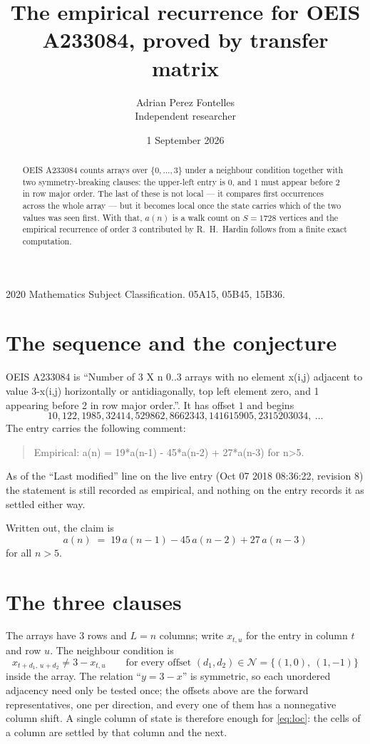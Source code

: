 \documentclass[11pt,a4paper]{article}
\title{The empirical recurrence for OEIS A233084, proved by transfer matrix}
\author{Adrian Perez Fontelles\\ \small Independent researcher}
\date{1 September 2026}
\theoremstyle{plain}
\theoremstyle{definition}
\begin{document}
\maketitle

\begin{abstract}
OEIS A233084 counts arrays over $\{0,\dots,3\}$ under a neighbour condition together with
two symmetry-breaking clauses: the upper-left entry is $0$, and $1$ must appear before
$2$ in row major order. The last of these is not local --- it compares first occurrences
across the whole array --- but it becomes local once the state carries which of the two values
was seen first. With that, $a(n)$ is a walk count on $S=1728$ vertices and the empirical
recurrence of order $3$ contributed by R.~H.~Hardin follows from a finite exact
computation.
\end{abstract}

\noindent\small 2020 Mathematics Subject Classification. 05A15, 05B45, 15B36.\normalsize

\section{The sequence and the conjecture}

OEIS A233084 is ``Number of 3 X n 0..3 arrays with no element x(i,j) adjacent to value 3-x(i,j) horizontally or antidiagonally, top left element zero, and 1 appearing before 2 in row major order.''. It has offset $1$ and begins
\[
10, 122, 1985, 32414, 529862, 8662343, 141615905, 2315203034,\ \dots
\]
The entry carries the following comment:
\begin{quote}\small
Empirical: a(n) = 19*a(n-1) - 45*a(n-2) + 27*a(n-3) for n>5.
\end{quote}
As of the ``Last modified'' line on the live entry (Oct 07 2018 08:36:22, revision 8) the statement is
still recorded as empirical, and nothing on the entry records it as settled either way.

Written out, the claim is
\begin{equation}\label{eq:conj}
a(n)\;=\;19\,a(n-1) - 45\,a(n-2) + 27\,a(n-3)
\end{equation}
for all $n>5$.

\section{The three clauses}

The arrays have $3$ rows and $L=n$ columns; write $x_{t,u}$ for the entry in
column $t$ and row $u$. The neighbour condition is
\begin{equation}\label{eq:loc}
x_{t+d_1,\,u+d_2}\ne 3-x_{t,u}\qquad\text{for every offset }(d_1,d_2)\in\mathcal N=\{(1,0),\ (1,-1)\}
\end{equation}
inside the array. The relation ``$y=3-x$'' is symmetric, so each unordered adjacency need
only be tested once; the offsets above are the forward representatives, one per direction,
and every one of them has a nonnegative column shift. A single column of state is therefore
enough for \eqref{eq:loc}: the cells of a column are settled by that column and the next.
\end{document}
